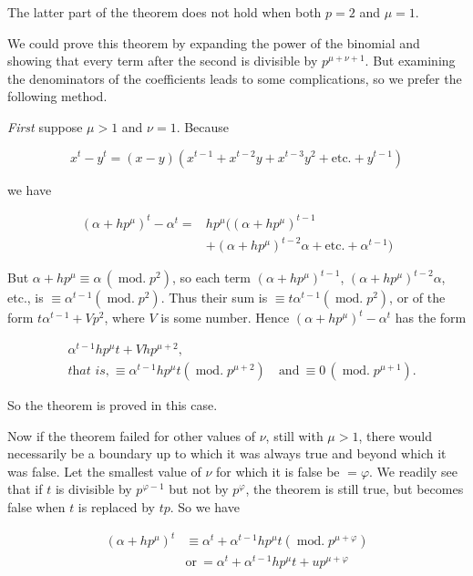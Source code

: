 The latter part of the theorem does not hold when both $p=2$ and $\mu=1$.

We could prove this theorem by expanding the power of the binomial and showing that every term after the second is divisible by $p^{\mu+\nu+1}$. But examining the denominators of the coefficients leads to some complications, so we prefer the following method.

\emph{First} suppose $\mu>1$ and $\nu=1$. Because

\[x^t-y^t=(x-y)(x^{t-1}+x^{t-2}y+x^{t-3}y^2+\text{etc.}+y^{t-1})\]

we have

\[\begin{aligned}
(\alpha+hp^{\mu})^t-\alpha^t={}&hp^{\mu}((\alpha+hp^{\mu})^{t-1}\\
&+(\alpha+hp^{\mu})^{t-2}\alpha+\text{etc.}+\alpha^{t-1})
\end{aligned}\]

But $\alpha+hp^{\mu}\equiv\alpha\,(\operatorname{mod.}p^2)$,
so each term $(\alpha+hp^{\mu})^{t-1}$, $(\alpha+hp^{\mu})^{t-2}\alpha$, etc., is $\equiv\alpha^{t-1}(\operatorname{mod.}p^2)$. Thus their sum is $\equiv t\alpha^{t-1}(\operatorname{mod.}p^2)$, or of the form $t\alpha^{t-1}+Vp^2$, where $V$ is some number. Hence $(\alpha+hp^{\mu})^t-\alpha^t$ has the form

\[\begin{aligned}
&\alpha^{t-1}hp^{\mu}t+Vhp^{\mu+2},\\
&\textit{that is,}\ \equiv\alpha^{t-1}hp^{\mu}t(\operatorname{mod.}p^{\mu+2})\quad\text{and}\ \equiv0\,(\operatorname{mod.}p^{\mu+1}).
\end{aligned}\]

\noindent So the theorem is proved in this case.

Now if the theorem failed for other values of $\nu$, still with $\mu>1$, there would necessarily be a boundary up to which it was always true and beyond which it was false. Let the smallest value of $\nu$ for which it is false be $=\varphi$. We readily see that if $t$ is divisible by $p^{\varphi-1}$ but not by $p^{\varphi}$, the theorem is still true, but becomes false when $t$ is replaced by $tp$. So we have

\[\begin{aligned}
(\alpha+hp^{\mu})^t&\equiv\alpha^t+\alpha^{t-1}hp^{\mu}t(\operatorname{mod.}p^{\mu+\varphi})\\
&\text{or}\ =\alpha^t+\alpha^{t-1}hp^{\mu}t+up^{\mu+\varphi}
\end{aligned}\]

